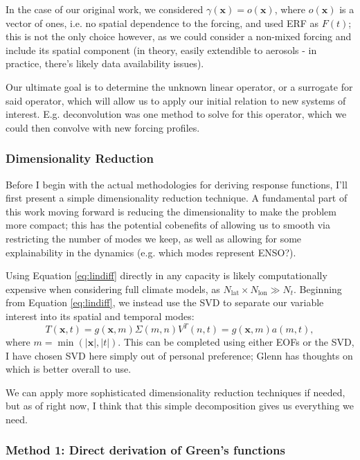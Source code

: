 In the case of our original work, we considered $\gamma(\mathbf{x}) = o(\mathbf{x})$, where $o(\mathbf{x})$ is a vector of ones, i.e. no spatial dependence to the forcing, and used ERF as $F(t)$; this is not the only choice however, as we could consider a non-mixed forcing and include its spatial component (in theory, easily extendible to aerosols - in practice, there's likely data availability issues).

Our ultimate goal is to determine the unknown linear operator, or a surrogate for said operator, which will allow us to apply our initial relation to new systems of interest. E.g. deconvolution was one method to solve for this operator, which we could then convolve with new forcing profiles.

\subsubsection*{Dimensionality Reduction}

Before I begin with the actual methodologies for deriving response functions, I'll first present a simple dimensionality reduction technique. A fundamental part of this work moving forward is reducing the dimensionality to make the problem more compact; this has the potential cobenefits of allowing us to smooth via restricting the number of modes we keep, as well as allowing for some explainability in the dynamics (e.g. which modes represent ENSO?).

Using Equation \ref{eq:lindiff} directly in any capacity is likely computationally expensive when considering full climate models, as $N_{\text{lat}} \times N_{\text{lon}} \gg N_t$. Beginning from Equation \ref{eq:lindiff}, we instead use the SVD to separate our variable interest into its spatial and temporal modes:
\begin{equation}
  T(\mathbf{x},t) = g(\mathbf{x},m)\Sigma(m,n)V^T(n,t) = g(\mathbf{x},m)a(m,t),
\end{equation}
where $m = \min(|\mathbf{x}|,|t|)$. This can be completed using either EOFs or the SVD, I have chosen SVD here simply out of personal preference; Glenn has thoughts on which is better overall to use.

We can apply more sophisticated dimensionality reduction techniques if needed, but as of right now, I think that this simple decomposition gives us everything we need.

\subsubsection{Method 1: Direct derivation of Green's functions}

